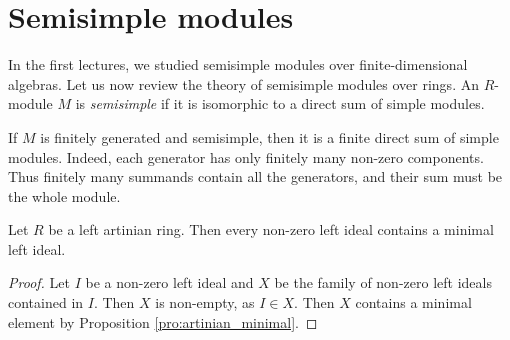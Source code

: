 \section{Semisimple modules}

In the first lectures, we studied semisimple modules over finite-dimensional 
algebras. Let us now review the theory of semisimple modules over rings. 
An $R$-module $M$ is \emph{semisimple} 
if it is isomorphic to a direct sum of simple modules. 

If $M$ is finitely generated and semisimple, then it is a
finite direct sum of simple modules. Indeed, each generator
has only finitely many non-zero components. Thus finitely
many summands contain all the generators, and their sum
must be the whole module.

\begin{proposition}
    Let $R$ be a left artinian ring. 
    Then every non-zero left ideal contains a minimal left ideal. 
\end{proposition}

\begin{proof}
    Let $I$ be a non-zero left ideal and 
    $X$ be the family of non-zero left ideals contained in $I$. Then $X$ is non-empty, as 
    $I\in X$. Then $X$ contains a minimal element by Proposition \ref{pro:artinian_minimal}. 
\end{proof}



